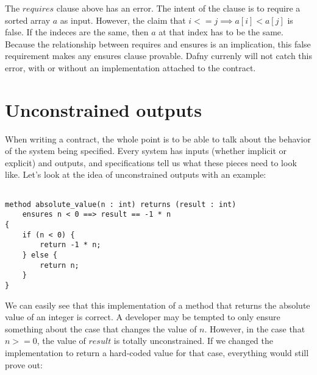 \documentclass{article}
\newif\ifcomments
\newcommand{\egm}[1]{\ifcomments\textcolor{orange}{egm: #1}\fi}
\begin{document}
The \(requires\) clause above has an error. The intent of the clause is to require a sorted array \(a\) as input.
However, the claim that \(i <= j \implies a[i] < a[j]\) is false. If the indeces are the same, then \(a\) at that
index has to be the same. Because the relationship between requires and ensures is an implication, this false requirement
makes any ensures clause provable. Dafny currenly will not catch this error, with or without an implementation attached to
the contract.
\egm{Swap the examples so they match their introduction order earlier in the sub-section with contradictions in the pre-conditions first. Make clear the two consequences of a contradiction: pre-condition is always violated in any calling context or anything can be proved about the post-state also in any calling context.}

\section{Unconstrained outputs}

\egm{Here the issue is framed in the context of an implementation, but the idea is to be agnostic to that implementation. Maybe consider just showing the contract? In cases such as the condractions, the issue is only discovered in the context if an implementation, so it that case, it some implementation code may make sense, but otherwise, focus on the contracts?}
When writing a contract, the whole point is to be able to talk about the behavior of the system being specified.
Every system has inputs (whether implicit or explicit) and outputs, and specifications tell us what these pieces need
to look like. Let’s look at the idea of unconstrained outputs with an example:

\begin{lstlisting}

method absolute_value(n : int) returns (result : int)
    ensures n < 0 ==> result == -1 * n
{
    if (n < 0) {
        return -1 * n;
    } else {
        return n;
    }
}

\end{lstlisting}

We can easily see that this implementation of a method that returns the absolute value of an integer is correct. A developer may be
tempted to only ensure something about the case that changes the value of \(n\). However, in the case that \(n >= 0\), the value
of \(result\) is totally unconstrained. If we changed the implementation to return a hard-coded value for that case, everything
would still prove out:
\end{document}
